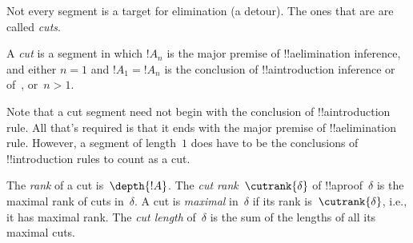 \documentclass[../../../include/open-logic-section]{subfiles}
\begin{document}
Not every segment is a target for elimination (a detour). The ones that
are are called \emph{cuts}.

\begin{defn}
A \emph{cut} is a segment in which $!A_n$ is the major premise of
!!a{elimination} inference, and either $n=1$ and $!A_1 = !A_n$ is the
conclusion of !!a{introduction} inference or of~\FalseInt, or~$n>1$.
\end{defn}

Note that a cut segment need not begin with the conclusion of
!!a{introduction} rule. All that's required is that it ends with the
major premise of !!a{elimination} rule. However, a segment of
length~$1$ does have to be the conclusions of !!{introduction} rules
to count as a cut.

\begin{defn}
The \emph{rank} of a cut is~$\depth{!A}$. The \emph{cut
rank}~$\cutrank{\delta}$ of !!a{proof}~$\delta$ is the maximal rank of
cuts in~$\delta$. A cut is \emph{maximal} in~$\delta$ if its rank
is~$\cutrank{\delta}$, i.e., it has maximal rank. The \emph{cut length}
of~$\delta$ is the sum of the lengths of all its maximal cuts.
\end{defn}
\end{document}
